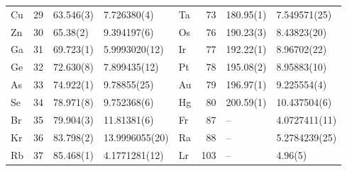 \documentclass[11pt]{article}
\theoremstyle{definition}\newtheorem{definition}[theorem]{Definition}
\theoremstyle{remark}\newtheorem{remark}[theorem]{Remark}
\begin{document}
\begin{table}[htbp]
\begin{tabular}{@{}lrll@{\hspace{14pt}}lrll@{}}
Cu & 29 & 63.546(3) & 7.726380(4) & Ta & 73 & 180.95(1) & 7.549571(25)\\
Zn & 30 & 65.38(2) & 9.394197(6) & Os & 76 & 190.23(3) & 8.43823(20)\\
Ga & 31 & 69.723(1) & 5.9993020(12) & Ir & 77 & 192.22(1) & 8.96702(22)\\
Ge & 32 & 72.630(8) & 7.899435(12) & Pt & 78 & 195.08(2) & 8.95883(10)\\
As & 33 & 74.922(1) & 9.78855(25) & Au & 79 & 196.97(1) & 9.225554(4)\\
Se & 34 & 78.971(8) & 9.752368(6) & Hg & 80 & 200.59(1) & 10.437504(6)\\
Br & 35 & 79.904(3) & 11.81381(6) & Fr & 87 & -- & 4.0727411(11)\\
Kr & 36 & 83.798(2) & 13.9996055(20) & Ra & 88 & -- & 5.2784239(25)\\
Rb & 37 & 85.468(1) & 4.1771281(12) & Lr & 103 & -- & 4.96(5)\\\bottomrule
\end{tabular}
\end{table}
\end{document}
